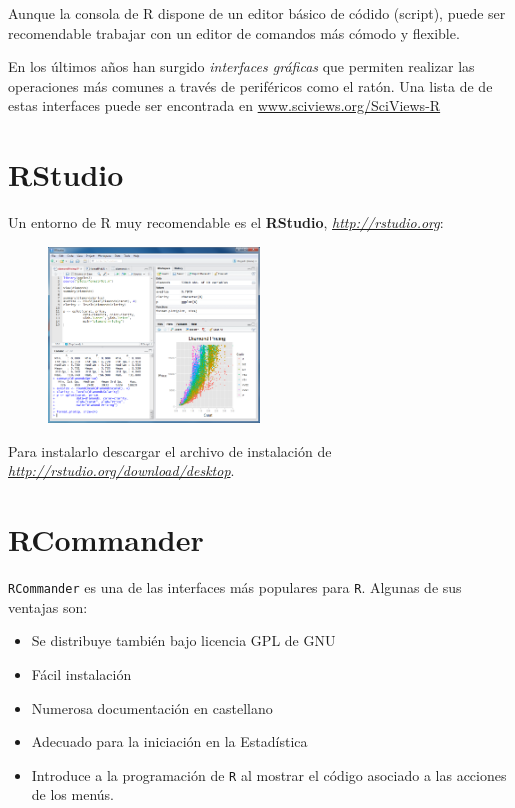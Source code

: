\documentclass[]{book}
\begin{document}
Aunque la consola de R dispone de un editor básico de códido (script),
puede ser recomendable trabajar con un editor de comandos más cómodo y
flexible.

En los últimos años han surgido \emph{interfaces gráficas} que permiten
realizar las operaciones más comunes a través de periféricos como el
ratón. Una lista de de estas interfaces puede ser encontrada en
\url{www.sciviews.org/SciViews-R}

\section{RStudio}\label{rstudio}

Un entorno de R muy recomendable es el \textbf{RStudio},
\href{http://rstudio.org}{\emph{http://rstudio.org}}:

\begin{figure}
\centering
\includegraphics[width=0.50000\textwidth]{figuras/RStudio-screenshot.png}
\caption{}
\end{figure}

Para instalarlo descargar el archivo de instalación de
\href{http://rstudio.org/download/desktop}{\emph{http://rstudio.org/download/desktop}}.

\section{RCommander}\label{rcmdr}

\texttt{RCommander} es una de las interfaces más populares para
\texttt{R}. Algunas de sus ventajas son:

\begin{itemize}
\item
  Se distribuye también bajo licencia GPL de GNU
\item
  Fácil instalación
\item
  Numerosa documentación en castellano
\item
  Adecuado para la iniciación en la Estadística
\item
  Introduce a la programación de \texttt{R} al mostrar el código
  asociado a las acciones de los menús.
\end{itemize}
\end{document}
